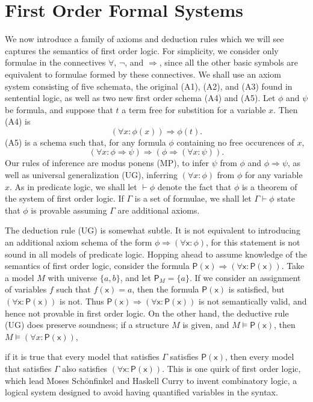 \section{First Order Formal Systems}

We now introduce a family of axioms and deduction rules which we will see captures the semantics of first order logic. For simplicity, we consider only formulae in the connectives $\forall$, $\neg$, and $\Rightarrow$, since all the other basic symbols are equivalent to formulae formed by these connectives. We shall use an axiom system consisting of five schemata, the original (A1), (A2), and (A3) found in sentential logic, as well as two new first order schema (A4) and (A5). Let $\phi$ and $\psi$ be formula, and suppose that $t$ a term free for substition for a variable $x$. Then (A4) is
%
\[ (\forall x: \phi(x)) \Rightarrow \phi(t). \]
%
(A5) is a schema such that, for any formula $\phi$ containing no free occurences of $x$,
%
\[ (\forall x: \phi \Rightarrow \psi) \Rightarrow (\phi \Rightarrow (\forall x: \psi)). \]
%
Our rules of inference are modus ponens (MP), to infer $\psi$ from $\phi$ and $\phi \Rightarrow \psi$, as well as universal generalization (UG), inferring $(\forall x: \phi)$ from $\phi$ for any variable $x$. As in predicate logic, we shall let $\vdash \phi$ denote the fact that $\phi$ is a theorem of the system of first order logic. If $\Gamma$ is a set of formulae, we shall let $\Gamma \vdash \phi$ state that $\phi$ is provable assuming $\Gamma$ are additional axioms.

\begin{remark}
    The deduction rule (UG) is somewhat subtle. It is not equivalent to introducing an additional axiom schema of the form $\phi \Rightarrow (\forall \mathsf{x}: \phi)$, for this statement is not sound in all models of predicate logic. Hopping ahead to assume knowledge of the semantics of first order logic, consider the formula $\mathsf{P(x) \Rightarrow (\forall x: P(x))}$. Take a model $M$ with universe $\{ a, b \}$, and let $\mathsf{P}_M = \{ a \}$. If we consider an assignment of variables $f$ such that $f( \mathsf{x} ) = a$, then the formula $\mathsf{P(x)}$ is satisfied, but $\mathsf{(\forall x: P(x))}$ is not. Thus $\mathsf{P(x) \Rightarrow (\forall x: P(x))}$ is not semantically valid, and hence not provable in first order logic. On the other hand, the deductive rule (UG) does preserve soundness; if a structure $M$ is given, and $M \vDash \mathsf{P(x)}$, then $M \vDash (\forall x: \mathsf{P(x)})$, 

    if it is true that every model that satisfies $\Gamma$ satisfies $\mathsf{P(x)}$, then every model that satisfies $\Gamma$ also satisfies $\mathsf{(\forall x: P(x))}$. This is one quirk of first order logic, which lead Moses Sch\"{o}nfinkel and Haskell Curry to invent combinatory logic, a logical system designed to avoid having quantified variables in the syntax.
\end{remark}

